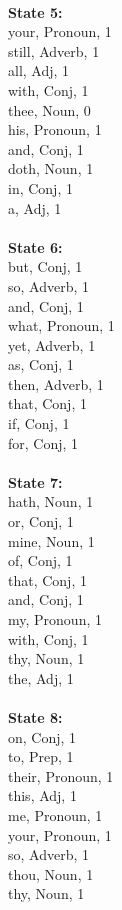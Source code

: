 \begin{multicols}{4}
\\
\noindent\textbf{State 5:} \\
your, Pronoun, 1\\
still, Adverb, 1\\
all, Adj, 1\\
with, Conj, 1\\
thee, Noun, 0\\
his, Pronoun, 1\\
and, Conj, 1\\
doth, Noun, 1\\
in, Conj, 1\\
a, Adj, 1\\
\\
\noindent\textbf{State 6:} \\
but, Conj, 1\\
so, Adverb, 1\\
and, Conj, 1\\
what, Pronoun, 1\\
yet, Adverb, 1\\
as, Conj, 1\\
then, Adverb, 1\\
that, Conj, 1\\
if, Conj, 1\\
for, Conj, 1\\
\\
\noindent\textbf{State 7:} \\
hath, Noun, 1\\
or, Conj, 1\\
mine, Noun, 1\\
of, Conj, 1\\
that, Conj, 1\\
and, Conj, 1\\
my, Pronoun, 1\\
with, Conj, 1\\
thy, Noun, 1\\
the, Adj, 1\\
\\
\noindent\textbf{State 8:} \\
on, Conj, 1\\
to, Prep, 1\\
their, Pronoun, 1\\
this, Adj, 1\\
me, Pronoun, 1\\
your, Pronoun, 1\\
so, Adverb, 1\\
thou, Noun, 1\\
thy, Noun, 1\\

\end{multicols}
